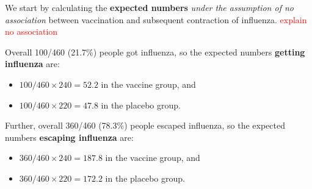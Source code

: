 \documentclass[compress, notes=hide]{beamer}
\newcommand{\hl}[1]{\textbf{#1}}
\begin{document}
\begin{frame}
	\begin{block}{}
		We start by calculating the \hl{expected numbers} \textit{under the
		assumption of no association} between vaccination and subsequent
		contraction of influenza. \textcolor{red}{explain no association}
		
		\vspace{0.2cm}
		Overall 100/460 (21.7\%) people got influenza, so the expected numbers
		\hl{getting influenza} are:
		\begin{itemize}
			\item{$100/460 \times 240 = 52.2$ in the vaccine group, and}
			\item{$100/460 \times 220 = 47.8$ in the placebo group.}
		\end{itemize}
		Further, overall 360/460 (78.3\%) people escaped influenza, so the expected numbers \hl{escaping influenza} are:
		\begin{itemize}
			\item{$360/460 \times 240 = 187.8$ in the vaccine group, and}
			\item{$360/460 \times 220 = 172.2$ in the placebo group.}
		\end{itemize}
	\end{block}
\end{frame}
\end{document}
